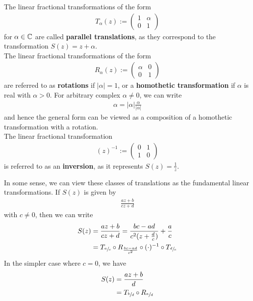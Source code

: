 \documentclass{memoir}
\begin{document}
\begin{defn}
	The linear fractional transformations of the form
	\begin{align*}
		T_\alpha (z) := \begin{pmatrix} 1 & \alpha \\ 0 & 1 \end{pmatrix} 
	\end{align*}
	for \(\alpha  \in \mathbb{C}\) are called \textbf{parallel translations}, as they correspond to the transformation \(S(z) = z + \alpha \).\\

	The linear fractional transformations of the form
	\begin{align*}
		R_\alpha (z) := \begin{pmatrix} \alpha  & 0 \\ 0 & 1 \end{pmatrix} 
	\end{align*}
	are referred to as \textbf{rotations} if \(\left| \alpha  \right| = 1\), or a \textbf{homothetic transformation} if \(\alpha \) is real with \(\alpha >0\). For arbitrary complex \(\alpha \neq 0\), we can write
	\begin{align*}
		\alpha  = \left| \alpha  \right| \frac{\alpha }{\left| \alpha  \right| }
	\end{align*}
	and hence the general form can be viewed as a composition of a homothetic transformation with a rotation.\\

	The linear fractional transformation
	\begin{align*}
	(z)^{-1} := \begin{pmatrix} 0 & 1 \\ 1 & 0 \end{pmatrix} 
	\end{align*}
	is referred to as an \textbf{inversion}, as it represents \(S(z) = \frac{1}{z}\).
\end{defn}
In some sense, we can view these classes of translations as the fundamental linear transformations. If \(S(z)\) is given by
\begin{align*}
	\frac{az+b}{cz+d}
\end{align*}
with \(c\neq 0\), then we can write
\begin{align*}
	S(z) &= \frac{az+b}{c z+d} = \frac{bc-ad}{c^2(z+\frac{d}{c})}+ \frac{a}{c}\\
	&=  T_{\sfrac{a}{c}}\circ R_{\frac{bc-ad}{c^2}}\circ (\cdot)^{-1} \circ T_{\sfrac{d}{c}}
\end{align*}
In the simpler case where \(c=0\), we have
\begin{align*}
	S(z) &= \frac{az+b}{d}\\
	&= T_{\sfrac{b}{d}}\circ R_{\sfrac{a}{d}}
\end{align*}
\end{document}
